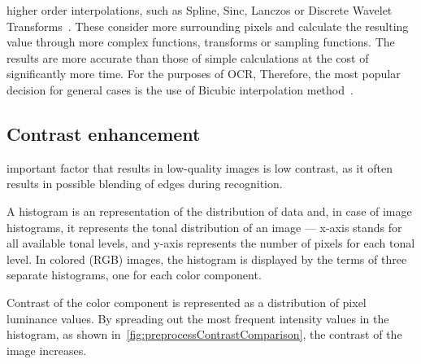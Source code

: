  higher order interpolations, such as Spline, Sinc, Lanczos or Discrete Wavelet Transforms~\cite{interpolation}. These consider more surrounding pixels and calculate the resulting value through more complex functions,  transforms or sampling functions. The results are more accurate than those of simple calculations at the cost of significantly more time. For the purposes of OCR,  Therefore, the most popular decision for general cases is the use of Bicubic interpolation method~\cite{interpolationComp}.

\subsection{Contrast enhancement} \label{contrastEnhancemet}

 important factor that results in low-quality images is low contrast, as it often results in possible blending of edges during recognition.

 A histogram is an  representation of the distribution of data and, in case of image histograms, it represents the tonal distribution of an image --- x-axis stands for all available tonal levels, and y-axis represents the number of pixels for each tonal level. In colored (RGB) images, the histogram is displayed by the terms of three separate histograms, one for each color component.

Contrast of the  color component is represented as a distribution of pixel luminance values. By spreading out the most frequent intensity values in the histogram, as shown in~\cref{fig:preprocessContrastComparison}, the contrast of the image increases.

